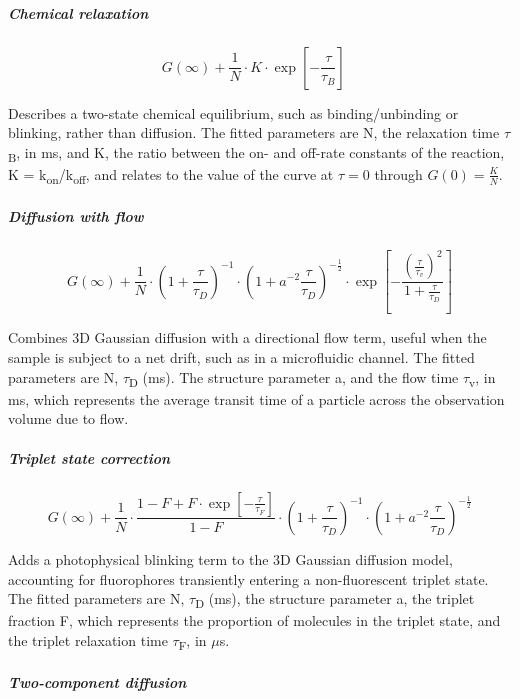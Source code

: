 \documentclass[
]{article}
\begin{document}
\hypertarget{chemical-relaxation}{%
\subparagraph{Chemical relaxation}\label{chemical-relaxation}}

\[\ \ \ \ G(\infty) + \frac{1}{N} \cdot K \cdot \exp\left\lbrack - \frac{\tau}{\tau_{B}} \right\rbrack\ \ \ \ \ \ \ \ \]

Describes a two-state chemical equilibrium, such as binding/unbinding or
blinking, rather than diffusion. The fitted parameters are N, the
relaxation time $\tau$\textsubscript{B}, in ms, and K, the ratio between the
on- and off-rate constants of the reaction, K =
k\textsubscript{on}/k\textsubscript{off}, and relates to the value of the curve at $\tau=0$ through $G(0) = \frac{K}{N}$.

\hypertarget{diffusion-with-flow}{%
\subparagraph{Diffusion with flow}\label{diffusion-with-flow}}

\[G(\infty) + \frac{1}{N} \cdot \left( 1 + \frac{\tau}{\tau_{D}} \right)^{- 1} \cdot \left( 1 + a^{- 2}\frac{\tau}{\tau_{D}} \right)^{- \frac{1}{2}} \cdot \exp\left\lbrack - \frac{\left( \frac{\tau}{\tau_{v}} \right)^{2}}{1 + \frac{\tau}{\tau_{D}}} \right\rbrack\]

Combines 3D Gaussian diffusion with a directional flow term, useful when
the sample is subject to a net drift, such as in a microfluidic channel.
The fitted parameters are N, $\tau$\textsubscript{D} (ms). The structure
parameter a, and the flow time $\tau$\textsubscript{v}, in ms, which
represents the average transit time of a particle across the observation
volume due to flow.

\hypertarget{triplet-state-correction}{%
\subparagraph{Triplet state
correction}\label{triplet-state-correction}}

\[G(\infty) + \frac{1}{N} \cdot \frac{1 - F + F \cdot \exp\left\lbrack - \frac{\tau}{\tau_{F}} \right\rbrack}{1 - F} \cdot \left( 1 + \frac{\tau}{\tau_{D}} \right)^{- 1} \cdot \left( 1 + a^{- 2}\frac{\tau}{\tau_{D}} \right)^{- \frac{1}{2}}\]

Adds a photophysical blinking term to the 3D Gaussian diffusion model,
accounting for fluorophores transiently entering a non-fluorescent
triplet state. The fitted parameters are N, $\tau$\textsubscript{D} (ms), the
structure parameter a, the triplet fraction F, which represents the
proportion of molecules in the triplet state, and the triplet relaxation
time $\tau$\textsubscript{F}, in $\mu$s.

\hypertarget{two-component-diffusion}{%
\subparagraph{Two-component diffusion}\label{two-component-diffusion}}
\end{document}
